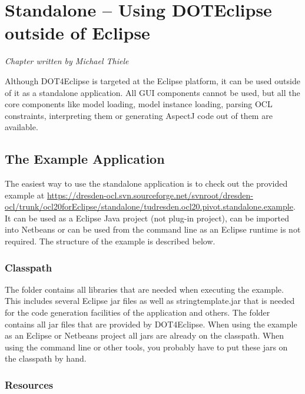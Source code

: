 \chapter{Standalone -- Using \acl{DOTEclipse} outside of Eclipse}
\label{chapter:standalone}

\begin{flushright}
\textit{Chapter written by Michael Thiele}
\end{flushright}

Although \acl{DOT4Eclipse} is targeted at the Eclipse platform, it can be used outside of it as a standalone application. All GUI components cannot be used, but all the core components like model loading, model instance loading, parsing OCL constraints, interpreting them or generating AspectJ code out of them are available.


\section{The Example Application}

The easiest way to use the standalone application is to check out the provided example at \url{https://dresden-ocl.svn.sourceforge.net/svnroot/dresden-ocl/trunk/ocl20forEclipse/standalone/tudresden.ocl20.pivot.standalone.example}. It can be used as a Eclipse Java project (not plug-in project), can be imported into Netbeans or can be used from the command line as an Eclipse runtime is not required. The structure of the example is described below.


\subsection{Classpath}

The  folder contains all libraries that are needed when executing the example. This includes several Eclipse jar files as well as stringtemplate.jar that is needed for the code generation facilities of the application and others. The  folder contains all jar files that are provided by \acl{DOT4Eclipse}. When using the example as an Eclipse or Netbeans project all jars are already on the classpath. When using the command line or other tools, you probably have to put these jars on the classpath by hand.


\subsection{Resources}

